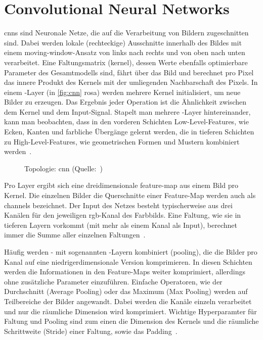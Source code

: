 \label{sec:conv}

\section{Convolutional Neural Networks}
\label{sec:cnn}

\glspl{cnn} sind Neuronale Netze, die auf die Verarbeitung von Bildern zugeschnitten sind.
Dabei werden lokale (rechteckige) Ausschnitte innerhalb des Bildes mit einem \gls{moving-window}-Ansatz von links nach rechts und von oben nach unten verarbeitet.
Eine Faltungsmatrix (\gls{kernel}), dessen Werte ebenfalls optimierbare Parameter des Gesamtmodells sind, fährt über das Bild und berechnet pro Pixel das innere Produkt des Kernels mit der umliegenden Nachbarschaft des Pixels.
In einem \conv-Layer (in \autoref{fig:cnn} rosa) werden mehrere Kernel initialisiert, um neue Bilder zu erzeugen.
Das Ergebnis jeder Operation ist die Ähnlichkeit zwischen dem Kernel und dem Input-Signal.
Stapelt man mehrere \conv-Layer hintereinander, kann man beobachten, dass in den vorderen Schichten Low-Level-Features, wie Ecken, Kanten und farbliche Übergänge gelernt werden, die in tieferen Schichten zu High-Level-Features, wie geometrischen Formen und Mustern kombiniert werden~\cite{Burkov19}.

\begin{figure}[hb!]
    \centering
    \caption{Topologie: \gls{cnn} (Quelle:~\cite{Veen17})}
    \label{fig:cnn}
\end{figure}

Pro Layer ergibt sich eine dreidimensionale \gls{feature-map} aus einem Bild pro Kernel.
Die einzelnen Bilder \bzw die Querschnitte einer Feature-Map werden auch als \glspl{channel} bezeichnet.
Der Input des Netzes besteht typischerweise aus drei Kanälen für den jeweiligen \gls{rgb}-Kanal des Farbbilds.
Eine Faltung, wie sie in tieferen Layern vorkommt (mit mehr als einem Kanal als Input), berechnet immer die Summe aller einzelnen Faltungen~\cite{Burkov19}.

Häufig werden \conv- mit sogenannten \pool-Layern kombiniert (\gls{pooling}), die die Bilder pro Kanal auf eine niedrigerdimensionale Version komprimieren.
In diesen Schichten werden die Informationen in den Feature-Maps weiter komprimiert, allerdings ohne zusätzliche Parameter einzuführen.
Einfache Operatoren, wie der Durchschnitt (Average Pooling) oder das Maximum (Max Pooling) werden auf Teilbereiche der Bilder angewandt.
Dabei werden die Kanäle einzeln verarbeitet und nur die räumliche Dimension wird komprimiert.
Wichtige Hyperparamter für Faltung und Pooling sind zum einen die Dimension des Kernels und die räumliche Schrittweite (Stride) einer Faltung, sowie das Padding~\cite{Burkov19}.

